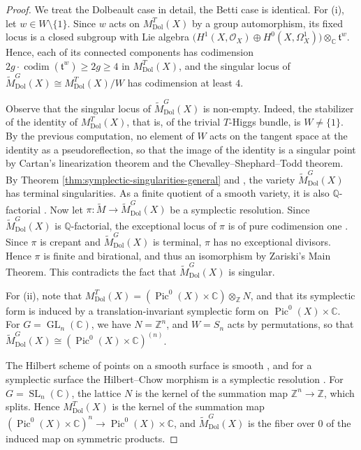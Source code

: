 \documentclass[11pt, a4paper]{amsart}
\theoremstyle{definition}
\theoremstyle{myitemstyle}
\newcommand{\Z}{\mathbb{Z}}
\newcommand{\Q}{\mathbb{Q}}
\newcommand{\C}{\mathbb{C}}
\newcommand{\mc}[1]{{\mathcal{#1}}}
\DeclareMathOperator{\Pic}{Pic}
\DeclareMathOperator{\codim}{codim}
\DeclareMathOperator{\GL}{GL}
\DeclareMathOperator{\SL}{SL}
\newcommand{\Dol}{{\mathrm{Dol}}}
\begin{document}
\begin{proof}
	We treat the Dolbeault case in detail, the Betti case is identical.  For (i), let $w\in W\setminus\{1\}$. Since $w$ acts on $M^T_\Dol(X)$ by a group automorphism, its fixed locus is a closed subgroup with Lie algebra $\big(H^1(X,\mc O_X)\oplus H^0(X,\Omega^1_X)\big)\otimes_\C\mathfrak t^w$. Hence, each of its connected components has codimension $2g\cdot\codim(\mathfrak t^w)\geq2g\geq4$ in $M^T_\Dol(X)$, and the singular locus of $\widetilde M^G_\Dol(X)\cong M^T_\Dol(X)/W$ has codimension at least $4$. 
    
    Observe that the  singular locus  of $\widetilde{M}^G_\Dol(X)$ is non-empty. Indeed, the stabilizer of the identity of $M^T_\Dol(X)$, that is, of the trivial $T$-Higgs bundle, is $W\neq\{1\}$. By the previous computation, no element of $W$ acts on the tangent space at the identity as a pseudoreflection, so that the image of the identity is a singular point by Cartan's linearization theorem and the Chevalley--Shephard--Todd theorem. By Theorem \ref{thm:symplectic-singularities-general} and \cite[Corollary 1]{N01}, the variety $\widetilde M^G_\Dol(X)$ has terminal singularities. As a finite quotient of a smooth variety, it is also $\Q$-factorial \cite[Lemma 5.16]{KM98}. Now let $\pi\colon\widetilde M\to\widetilde M^G_\Dol(X)$ be a symplectic resolution. Since $\widetilde M^G_\Dol(X)$ is $\Q$-factorial, the exceptional locus of $\pi$ is of pure codimension one \cite[Corollary 2.63]{KM98}. Since $\pi$ is crepant and $\widetilde M^G_\Dol(X)$ is terminal, $\pi$ has no exceptional divisors. Hence $\pi$ is finite and birational, and thus an isomorphism by Zariski's Main Theorem. This contradicts the fact that $\widetilde M^G_\Dol(X)$ is singular.
	
	For (ii), note that $M^T_\Dol(X)=(\Pic^0(X)\times\C)\otimes_\Z N$, and that its symplectic form is induced by a translation-invariant symplectic form on $\Pic^0(X)\times\C$. For $G=\GL_n(\C)$, we have $N=\Z^n$, and $W=S_n$ acts by permutations, so that $\widetilde M^G_\Dol(X)\cong(\Pic^0(X)\times\C)^{(n)}$. 
    
    The Hilbert scheme of points on a smooth surface is smooth \cite{F68}, and for a symplectic surface the Hilbert--Chow morphism is a symplectic resolution \cite{B83}. For $G=\SL_n(\C)$, the lattice $N$ is the kernel of the summation map $\Z^n\to\Z$, which splits. Hence $M^T_\Dol(X)$ is the kernel of the summation map $(\Pic^0(X)\times\C)^n\to\Pic^0(X)\times\C$, and $\widetilde M^G_\Dol(X)$ is the fiber over $0$ of the induced map on symmetric products. 
    

\end{proof}
\end{document}
